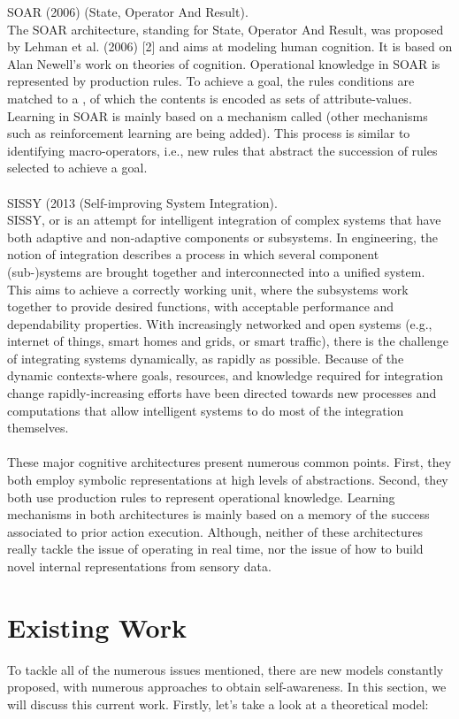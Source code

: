 \documentclass{amsbook}
\begin{document}
{SOAR (2006) (State, Operator And Result).\\
The SOAR architecture, standing for State, Operator And Result, was proposed by Lehman et al. (2006) [2] and aims at modeling human cognition. It is based on Alan Newell’s work on theories of cognition. Operational knowledge in SOAR is represented by production rules. To achieve a goal, the rules conditions are matched to a , of which the contents is encoded as sets of attribute-values. Learning in SOAR is mainly based on a mechanism called  (other mechanisms such as reinforcement learning are being added). This process is similar to identifying macro-operators, i.e., new rules that abstract the succession of rules selected to achieve a goal. \\\\
SISSY (2013 (Self-improving System Integration).\\
SISSY, or  is an attempt for intelligent integration of complex systems that have both adaptive and non-adaptive components or subsystems. In engineering, the notion of integration describes a process in which several component (sub-)systems are brought together and interconnected into a unified system. This aims to achieve a correctly working unit, where the subsystems work together to provide desired functions, with acceptable performance and dependability properties. With increasingly networked and open systems (e.g., internet of things, smart homes and grids, or smart traffic), there is the challenge of integrating systems dynamically, as rapidly as possible. Because of the dynamic contexts-where goals, resources, and knowledge required for integration change rapidly-increasing efforts have been directed towards new processes and computations that allow intelligent systems to do most of the integration themselves.
\\\\
These major cognitive architectures present numerous common points. First, they both employ symbolic representations at high levels of abstractions. Second, they both use production rules to represent operational knowledge. Learning mechanisms in both architectures is mainly based on a memory of the success associated to prior action execution. Although, neither of these architectures really tackle the issue of operating in real time, nor the issue of how to build novel internal representations from sensory data. \clearpage
\huge{\section{Existing Work}
\vskip 0.2cm
To tackle all of the numerous issues mentioned, there are new models constantly proposed, with numerous approaches to obtain self-awareness. In this section, we will discuss this current work. Firstly, let's take a look at a theoretical model:\\\\

}}
\end{document}
